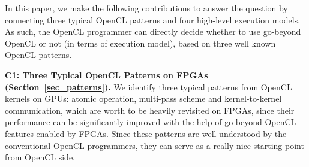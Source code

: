 In this paper, we make the following contributions to answer the question by connecting three typical OpenCL patterns and four high-level execution models. As such, the OpenCL programmer can directly decide whether to use go-beyond OpenCL or not (in terms of execution model), based on three well known OpenCL patterns. %


\vspace{0.4em}
\noindent
{\bf C1: Three Typical OpenCL Patterns on FPGAs (Section~\ref{sec_patterns}). }We identify three typical patterns from OpenCL kernels on GPUs: atomic operation, multi-pass scheme and kernel-to-kernel communication, which are worth to be heavily revisited on FPGAs, since their performance can be significantly improved with the help of go-beyond-OpenCL features enabled by FPGAs. Since these patterns are well understood by the conventional OpenCL programmers, they can serve as a really nice starting point from OpenCL side. %

